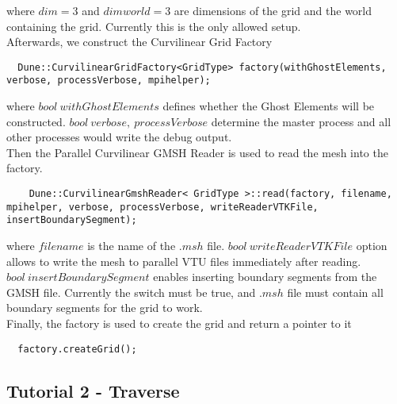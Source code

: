 \documentclass[12pt]{article}
\begin{document}
\noindent
where $dim=3$ and $dimworld=3$ are dimensions of the grid and the world containing the grid. Currently this is the only allowed setup. \\

\noindent
Afterwards, we construct the Curvilinear Grid Factory \\

\begin{mybox}
\begin{lstlisting}
  Dune::CurvilinearGridFactory<GridType> factory(withGhostElements, verbose, processVerbose, mpihelper);
\end{lstlisting}
\end{mybox}

\noindent
where $bool\ withGhostElements$ defines whether the Ghost Elements will be constructed. $bool\ verbose,\ processVerbose$ determine the master process and all other processes would write the debug output. \\

\noindent
Then the Parallel Curvilinear GMSH Reader is used to read the mesh into the factory. \\

\begin{mybox}
\begin{lstlisting}
    Dune::CurvilinearGmshReader< GridType >::read(factory, filename, mpihelper, verbose, processVerbose, writeReaderVTKFile, insertBoundarySegment); 
\end{lstlisting}
\end{mybox}

\noindent
where $filename$ is the name of the $.msh$ file. $bool\ writeReaderVTKFile$ option allows to write the mesh to parallel VTU files immediately after reading. $bool\ insertBoundarySegment$ enables inserting boundary segments from the GMSH file. Currently the switch must be true, and $.msh$ file must contain all boundary segments for the grid to work. \\

\noindent
Finally, the factory is used to create the grid and return a pointer to it \\
\begin{mybox}
\begin{lstlisting}
  factory.createGrid();
\end{lstlisting}
\end{mybox}


\subsection{Tutorial 2 - Traverse}
\end{document}
